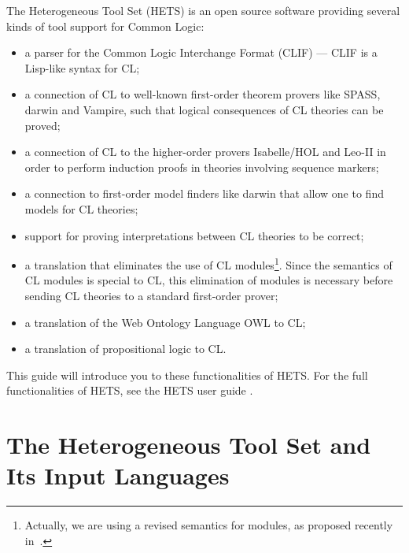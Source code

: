 \documentclass{article}
\newcommand{\normalTEXTSC}[2]{{#1\scriptsize#2}}
\newcommand     {\Hets}{\normalTEXTSC{H}{ETS}\xspace}
\begin{document}
The Heterogeneous Tool Set (\Hets) is an open source software providing
several kinds of tool support for Common Logic:
\begin{itemize}
\item a parser for the Common Logic Interchange Format (CLIF) --- CLIF
  is a Lisp-like syntax for CL;
\item a connection of CL to well-known first-order theorem provers
like SPASS, darwin and Vampire, such that logical consequences
of CL theories can be proved;
\item a connection of CL to the higher-order provers Isabelle/HOL
and Leo-II in order to perform induction proofs in theories
involving sequence markers;
\item a connection to first-order model finders like darwin that
allow one to find models for CL theories;
\item support for proving interpretations between CL theories to be correct;
\item a translation that eliminates the use of CL modules\footnote{Actually, we are using a revised semantics for modules, as proposed
recently in~\cite{NH:CommonLogicHoratio}.}. Since the semantics of CL modules
is special to CL, this elimination of modules is necessary before
sending CL theories to a standard first-order prover;
\item a translation of the Web Ontology Language OWL to CL;
\item a translation of propositional logic to CL.
\end{itemize}

This guide will introduce you to these functionalities of \Hets.
For the full functionalities of \Hets, see the \Hets user guide  
\cite{HetsUserGuide}.


\section{The Heterogeneous Tool Set and Its Input Languages}
\end{document}
